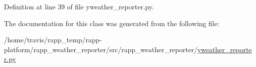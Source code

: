 Definition at line 39 of file yweather\-\_\-reporter.\-py.



The documentation for this class was generated from the following file\-:\begin{DoxyCompactItemize}
\item 
/home/travis/rapp\-\_\-temp/rapp-\/platform/rapp\-\_\-weather\-\_\-reporter/src/rapp\-\_\-weather\-\_\-reporter/\hyperlink{yweather__reporter_8py}{yweather\-\_\-reporter.\-py}\end{DoxyCompactItemize}
